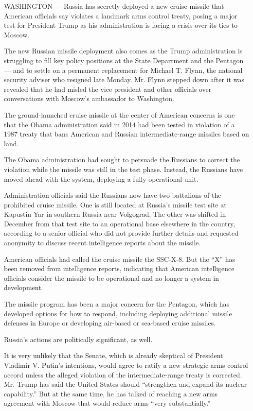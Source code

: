 WASHINGTON --- Russia has secretly deployed a new cruise missile that
American officials say violates a landmark arms control treaty, posing a
major test for President Trump as his administration is facing a crisis
over its ties to Moscow.

The new Russian missile deployment also comes as the Trump
administration is struggling to fill key policy positions at the State
Department and the Pentagon --- and to settle on a permanent replacement
for Michael T. Flynn, the national security adviser who resigned late
Monday. Mr. Flynn stepped down after it was revealed that he had misled
the vice president and other officials over conversations with Moscow's
ambassador to Washington.

The ground-launched cruise missile at the center of American concerns is
one that the Obama administration said in 2014 had been tested in
violation of a 1987 treaty that bans American and Russian
intermediate-range missiles based on land.

The Obama administration had sought to persuade the Russians to correct
the violation while the missile was still in the test phase. Instead,
the Russians have moved ahead with the system, deploying a fully
operational unit.

Administration officials said the Russians now have two battalions of
the prohibited cruise missile. One is still located at Russia's missile
test site at Kapustin Yar in southern Russia near Volgograd. The other
was shifted in December from that test site to an operational base
elsewhere in the country, according to a senior official who did not
provide further details and requested anonymity to discuss recent
intelligence reports about the missile.

American officials had called the cruise missile the SSC-X-8. But the
``X'' has been removed from intelligence reports, indicating that
American intelligence officials consider the missile to be operational
and no longer a system in development.

The missile program has been a major concern for the Pentagon, which has
developed options for how to respond, including deploying additional
missile defenses in Europe or developing air-based or sea-based cruise
missiles.

Russia's actions are politically significant, as well.

It is very unlikely that the Senate, which is already skeptical of
President Vladimir V. Putin's intentions, would agree to ratify a new
strategic arms control accord unless the alleged violation of the
intermediate-range treaty is corrected. Mr. Trump has said the United
States should ``strengthen and expand its nuclear capability.'' But at
the same time, he has talked of reaching a new arms agreement with
Moscow that would reduce arms ``very substantially.''

